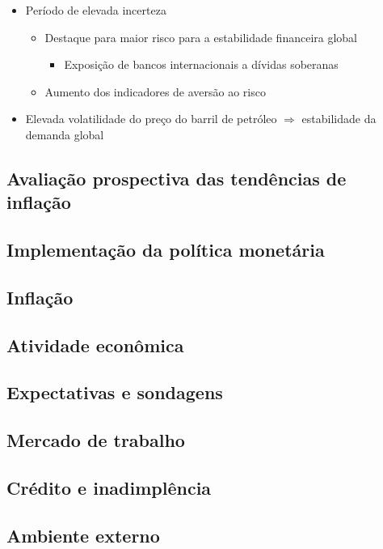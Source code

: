 \documentclass[11pt]{article}
\begin{document}
\begin{itemize}
\begin{itemize}
\end{itemize}
\item Período de elevada incerteza
\begin{itemize}
\item Destaque para maior risco para a estabilidade financeira global
\begin{itemize}
\item Exposição de bancos internacionais a dívidas soberanas
\end{itemize}
\item Aumento dos indicadores de aversão ao risco
\end{itemize}
\item Elevada volatilidade do preço do barril de petróleo \(\Rightarrow\) estabilidade da demanda global
\end{itemize}
\subsection*{Avaliação prospectiva das tendências de inflação}
\label{sec:orgebe394f}
\subsection*{Implementação da política monetária}
\label{sec:org390defa}
\subsection*{Inflação}
\label{sec:org97d03fc}
\subsection*{Atividade econômica}
\label{sec:org9690dae}
\subsection*{Expectativas e sondagens}
\label{sec:org06529c5}
\subsection*{Mercado de trabalho}
\label{sec:org2e48ff4}
\subsection*{Crédito e inadimplência}
\label{sec:org6733542}
\subsection*{Ambiente externo}
\label{sec:org38c76d7}
\end{document}
